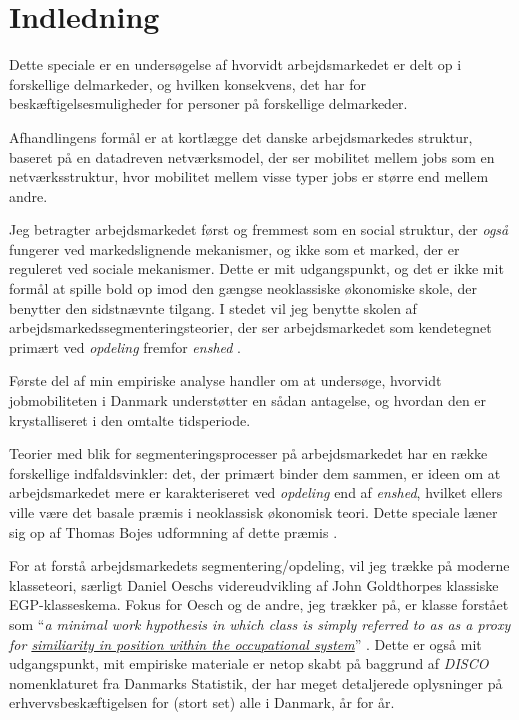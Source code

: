 


\chapter{Indledning \label{indledning}}




Dette speciale er en undersøgelse af hvorvidt arbejdsmarkedet er delt op i forskellige delmarkeder, og hvilken konsekvens, det har for beskæftigelsesmuligheder for personer på forskellige delmarkeder. 

Afhandlingens formål er at kortlægge det danske arbejdsmarkedes struktur, baseret på en datadreven netværksmodel, der ser mobilitet mellem jobs som en netværksstruktur, hvor mobilitet mellem visse typer jobs er større end mellem andre. 

Jeg betragter arbejdsmarkedet først og fremmest som en social struktur, der \emph{også} fungerer ved markedslignende mekanismer, og ikke som et marked, der er reguleret ved sociale mekanismer. Dette er mit udgangspunkt, og det er ikke mit formål at spille bold op imod den gængse neoklassiske økonomiske skole, der benytter den sidstnævnte tilgang. I stedet vil jeg benytte skolen af arbejdsmarkedssegmenteringsteorier, der ser arbejdsmarkedet som kendetegnet primært ved \emph{opdeling} fremfor \emph{enshed}  \parencite[174]{Boje1986}.

Første del af min empiriske analyse handler om at undersøge, hvorvidt jobmobiliteten i Danmark understøtter en sådan antagelse, og hvordan den er krystalliseret i den omtalte tidsperiode. 

Teorier med blik for segmenteringsprocesser på arbejdsmarkedet har en række forskellige indfaldsvinkler: det, der primært binder dem sammen, er ideen om at arbejdsmarkedet mere er karakteriseret ved \emph{opdeling} end af \emph{enshed}, hvilket ellers ville være det basale præmis i neoklassisk økonomisk teori. Dette speciale læner sig op af Thomas Bojes udformning af dette præmis \parencite[174]{Boje1986}.

For at forstå arbejdsmarkedets segmentering/opdeling, vil jeg trække på moderne klasseteori, særligt Daniel Oeschs videreudvikling af John Goldthorpes klassiske EGP-klasseskema. Fokus for Oesch og de andre, jeg trækker på, er klasse forstået som “\emph{a minimal work hypothesis in which class is simply referred to as as a proxy for \uline{similiarity in position within the occupational system}}” \parencite[13]{Oesch2006a}. Dette er også mit udgangspunkt, mit empiriske materiale er netop skabt på baggrund af \emph{DISCO} nomenklaturet fra Danmarks Statistik, der har meget detaljerede oplysninger på erhvervsbeskæftigelsen for (stort set) alle i Danmark, år for år. 

